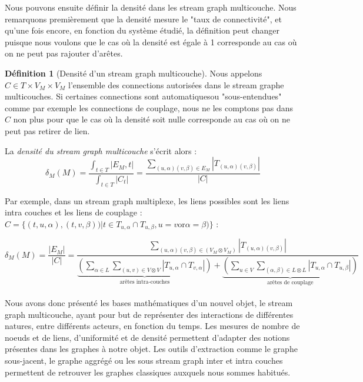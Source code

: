 \documentclass[11pt,a4paper]{article}
\theoremstyle{definition}
\newtheorem{defn}{Définition}
\theoremstyle{remark}
\theoremstyle{remark}
\def \stg {stream graph}
\def \stgm {stream graph multicouche}
\begin{document}
	Nous pouvons ensuite définir la densité dans les \stgm{}. Nous remarquons premièrement que la densité mesure le "taux de connectivité", et qu'une fois encore, en fonction du système étudié, la définition peut changer puisque nous voulons que le cas où la densité est égale à 1 corresponde au cas où on ne peut pas rajouter d'arêtes. 

\begin{defn}[Densité d'un \stgm{}]	
	Nous appelons  $C \in T \times V_M\times V_M$ l'ensemble des connections autorisées dans le stream graphe multicouches. Si certaines connections sont \og automatiques\fg ou "sous-entendues" comme par exemple les connections de couplage, nous ne les comptons pas dans $C$ non plus pour que le cas où la densité soit nulle corresponde au cas où on ne peut pas retirer de lien.

	La {\em densité du \stgm{}} s'écrit alors : 
	\[
		\delta_M (M) 
		= \frac{\int_{t\in T}|E_M,t|}{\int_{t\in T}|C_t|} 
		= \frac{\sum_{(u,\alpha)(v,\beta) \in E_M}|T_{(u,\alpha)(v,\beta)}|}{|C|}
	\]
\end{defn}	
	
	Par exemple, dans un \stg{} multiplexe, les liens possibles sont les liens intra couches et les liens de couplage : $C=\{(t,u,\alpha),(t,v,\beta))| t\in T_{u,\alpha} \cap T_{u,\beta}, u=v \text{or} \alpha = \beta)\}$ :

	\[
		\delta_M (M) = 
		\frac{|E_M|}{|C|}= 
		\frac{\sum_{(u,\alpha)(v,\beta) \in (V_M \otimes V_M)} |T_{(u,\alpha)(v,\beta)}|}
		{\underbrace{(\sum_{\alpha \in L}\sum_{(u,v) \in V\otimes V}|T_{u,\alpha} \cap T_{v,\alpha}|)}_{\text{arêtes intra-couches}}+\underbrace{( \sum_{u \in V } \sum_{(\alpha,\beta) \in L \otimes L}|T_{u,\alpha}\cap T_{u,\beta}|)}_{\text{arêtes de couplage}}}
	\]


\paragraph{}
Nous avons donc présenté les bases mathématiques d'un nouvel objet, le \stgm{}, ayant pour but de représenter des interactions de différentes natures, entre différents acteurs, en fonction du temps. Les mesures de nombre de noeuds et de liens, d'uniformité et de densité permettent d'adapter des notions présentes dans les graphes à notre objet. Les outils d'extraction comme le graphe sous-jacent, le graphe aggrégé ou les sous \stg{} inter et intra couches permettent de \og retrouver \fg{} les graphes classiques auxquels nous sommes habitués.
	
\end{document}
